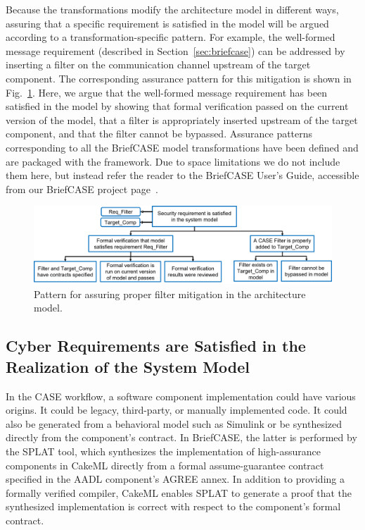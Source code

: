 Because the transformations modify the architecture model in different ways, assuring that a specific requirement is satisfied in the model will be argued according to a transformation-specific pattern.  For example, the well-formed message requirement (described in Section~\ref{sec:briefcase}) can be addressed by inserting a filter on the communication channel upstream of the target component.  The corresponding assurance pattern for this mitigation is shown in Fig.~\ref{fig:filter}.  Here, we argue that the well-formed message requirement has been satisfied in the model by showing that formal verification passed on the current version of the model, that a filter is appropriately inserted upstream of the target component, and that the filter cannot be bypassed.  Assurance patterns corresponding to all the BriefCASE model transformations have been defined and are packaged with the framework.  Due to space limitations we do not include them here, but instead refer the reader to the BriefCASE User's Guide, accessible from our BriefCASE project page~\cite{BriefCASE-project}.

\begin{figure}[h] 
	\centering 
	\includegraphics[width=\textwidth]{figs/filter.png}
	\caption{Pattern for assuring proper filter mitigation in the architecture model.}
	\label{fig:filter} 
\end{figure}

\subsection{Cyber Requirements are Satisfied in the Realization of the System Model}

In the CASE workflow, a software component implementation could have various origins.  It could be legacy, third-party, or manually implemented code. It could also be generated from a behavioral model such as Simulink or be synthesized directly from the component's contract.  In BriefCASE, the latter is performed by the SPLAT tool, which synthesizes the implementation of high-assurance components in CakeML directly from a formal assume-guarantee contract specified in the AADL component's AGREE annex.  In addition to providing a formally verified compiler, CakeML enables SPLAT to generate a proof that the synthesized implementation is correct with respect to the component's formal contract.

